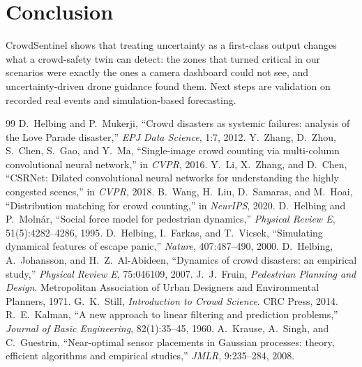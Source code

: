 \documentclass[10pt,twocolumn]{article}
\begin{document}
\section{Conclusion}
CrowdSentinel shows that treating uncertainty as a first-class output changes what a crowd-safety twin can detect: the zones that turned critical in our scenarios were exactly the ones a camera dashboard could not see, and uncertainty-driven drone guidance found them. Next steps are validation on recorded real events and simulation-based forecasting.

\begin{thebibliography}{99}\small
{} D.~Helbing and P.~Mukerji, ``Crowd disasters as systemic failures: analysis of the Love Parade disaster,'' \emph{EPJ Data Science}, 1:7, 2012.
 Y.~Zhang, D.~Zhou, S.~Chen, S.~Gao, and Y.~Ma, ``Single-image crowd counting via multi-column convolutional neural network,'' in \emph{CVPR}, 2016.
 Y.~Li, X.~Zhang, and D.~Chen, ``CSRNet: Dilated convolutional neural networks for understanding the highly congested scenes,'' in \emph{CVPR}, 2018.
 B.~Wang, H.~Liu, D.~Samaras, and M.~Hoai, ``Distribution matching for crowd counting,'' in \emph{NeurIPS}, 2020.
 D.~Helbing and P.~Moln\'ar, ``Social force model for pedestrian dynamics,'' \emph{Physical Review E}, 51(5):4282--4286, 1995.
 D.~Helbing, I.~Farkas, and T.~Vicsek, ``Simulating dynamical features of escape panic,'' \emph{Nature}, 407:487--490, 2000.
 D.~Helbing, A.~Johansson, and H.~Z.~Al-Abideen, ``Dynamics of crowd disasters: an empirical study,'' \emph{Physical Review E}, 75:046109, 2007.
 J.~J.~Fruin, \emph{Pedestrian Planning and Design}. Metropolitan Association of Urban Designers and Environmental Planners, 1971.
 G.~K.~Still, \emph{Introduction to Crowd Science}. CRC Press, 2014.
 R.~E.~Kalman, ``A new approach to linear filtering and prediction problems,'' \emph{Journal of Basic Engineering}, 82(1):35--45, 1960.
 A.~Krause, A.~Singh, and C.~Guestrin, ``Near-optimal sensor placements in Gaussian processes: theory, efficient algorithms and empirical studies,'' \emph{JMLR}, 9:235--284, 2008.
\end{thebibliography}
\end{document}
